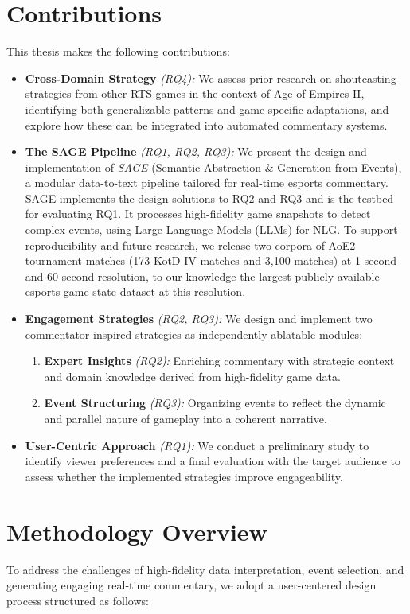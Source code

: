 \section{Contributions}
This thesis makes the following contributions:

\begin{itemize}
  \item \textbf{Cross-Domain Strategy} \textit{(RQ4):} We assess prior research on shoutcasting strategies from other RTS games in the context of Age of Empires II, identifying both generalizable patterns and game-specific adaptations, and explore how these can be integrated into automated commentary systems.
  \item \textbf{The SAGE Pipeline} \textit{(RQ1, RQ2, RQ3):} We present the design and implementation of \textit{SAGE} (Semantic Abstraction \& Generation from Events), a modular data-to-text pipeline tailored for real-time esports commentary. SAGE implements the design solutions to RQ2 and RQ3 and is the testbed for evaluating RQ1. It processes high-fidelity game snapshots to detect complex events, using Large Language Models (LLMs) for NLG. To support reproducibility and future research, we release two corpora of AoE2 tournament matches (173 KotD IV matches and 3,100 matches) at 1-second and 60-second resolution, to our knowledge the largest publicly available esports game-state dataset at this resolution.
  \item \textbf{Engagement Strategies} \textit{(RQ2, RQ3):} We design and implement two commentator-inspired strategies as independently ablatable modules:
    \begin{enumerate}
      \item \textbf{Expert Insights} \textit{(RQ2):} Enriching commentary with strategic context and domain knowledge derived from high-fidelity game data.
      \item \textbf{Event Structuring} \textit{(RQ3):} Organizing events to reflect the dynamic and parallel nature of gameplay into a coherent narrative.
    \end{enumerate}
  \item \textbf{User-Centric Approach} \textit{(RQ1):} We conduct a preliminary study to identify viewer preferences and a final evaluation with the target audience to assess whether the implemented strategies improve engageability.
\end{itemize}

\section{Methodology Overview}
To address the challenges of high-fidelity data interpretation, event selection, and generating engaging real-time commentary, we adopt a user-centered design process structured as follows:


